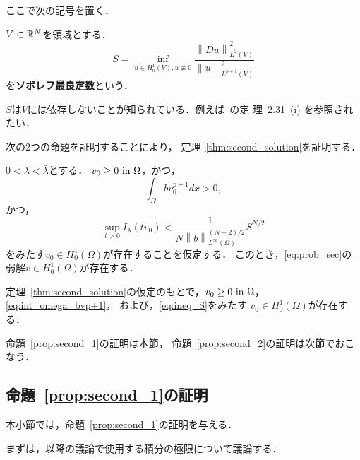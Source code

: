 ここで次の記号を置く．

\begin{defn} \label{defn:S_def}
 $V \subset \mathbb{R}^N$を領域とする．
 \begin{equation}
  S = \inf_{u \in H^1_0(V), u \not \equiv 0}
 \frac{\left\| Du \right\|_{L^2(V)}^2}{\left\| u
                                       \right\|_{L^{p+1}(V)}^2}  
 \label{eq:S_def}
 \end{equation}
 を{\bf ソボレフ最良定数}という．
\end{defn}

$S$は$V$には依存しないことが知られている．例えば~\cite{田中200808}の定
理~2.31~(i) を参照されたい．

次の2つの命題を証明することにより，
定理~\ref{thm:second_solution}を証明する．

\begin{prop} \label{prop:second_1}
 $0 < \lambda < \bar{\lambda}$とする．
 $v_0 \geq 0 ~\text{in}~ \Omega$，かつ，
 \begin{equation}
  \int_\Omega b v_0^{p+1} dx > 0, \label{eq:int_omega_bvp+1}  
 \end{equation}
 かつ，
 \begin{equation}
  \sup_{t > 0} I_\lambda (tv_0) < 
   \frac{1}{N\left\| b
             \right\|_{L^\infty(\Omega)} ^{(N-2)/2}} S^{N/2} 
   \label{eq:ineq_S}
 \end{equation}
 をみたす$v_0 \in H_0^1(\Omega)$が存在することを仮定する．
 このとき，\ref{eq:prob_sec}の弱解$v \in H_0^1(\Omega)$が存在する．
\end{prop}

\begin{prop} \label{prop:second_2}
 定理~\ref{thm:second_solution}の仮定のもとで，$v_0 \geq 0 ~\text{in}~
 \Omega$，\eqref{eq:int_omega_bvp+1}，
 および，\eqref{eq:ineq_S}をみたす
 $v_0 \in H_0^1(\Omega)$が存在する．
\end{prop}

命題~\ref{prop:second_1}の証明は本節，
命題~\ref{prop:second_2}の証明は次節でおこなう．

\subsection{命題~\ref{prop:second_1}の証明}

本小節では，命題~\ref{prop:second_1}の証明を与える．

まずは，以降の議論で使用する積分の極限について議論する．

